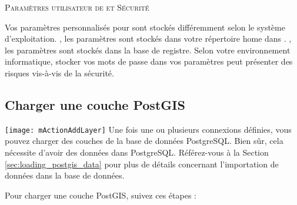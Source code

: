 \begin{Tip}\caption{\textsc{Paramètres utilisateur de \qg et Sécurité}}
Vos paramètres personnalisés pour \qg sont stockés différemment selon le système d'exploitation. \nix, les paramètres sont stockés dans votre répertoire home dans . \win, les paramètres sont stockés dans la base de registre. Selon votre environnement informatique, stocker vos mots de passe dans vos paramètres \qg peut présenter des risques vis-à-vis de la sécurité.
\end{Tip}

\subsection{Charger une couche PostGIS}

\texttt{[image: mActionAddLayer]} Une fois une ou plusieurs connexions définies, vous pouvez charger des couches de la base de données PostgreSQL. Bien sûr, cela nécessite d'avoir des données dans PostgreSQL. Référez-vous à la Section \ref{sec:loading_postgis_data} pour plus de détails concernant l'importation de données dans la base de données.

Pour charger une couche PostGIS, suivez ces étapes :

